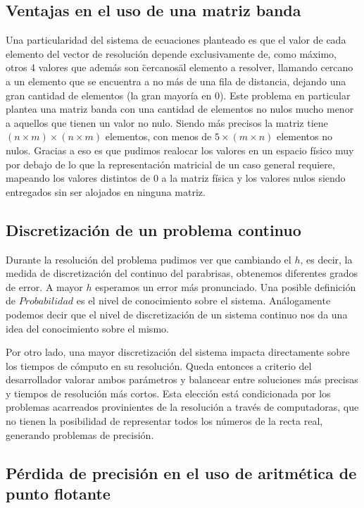 \subsection{Ventajas en el uso de una matriz banda}

Una particularidad del sistema de ecuaciones planteado es que el valor de cada elemento del vector de resoluci\'on depende exclusivamente de, como m\'aximo, otros 4 valores que adem\'as son \"cercanos\" al elemento a resolver, llamando cercano a un elemento que se encuentra a no m\'as de una fila de distancia, dejando una gran cantidad de elementos (la gran mayor\'ia en 0). Este problema en particular plantea una matriz banda con una cantidad de elementos no nulos mucho menor a aquellos que tienen un valor no nulo. Siendo m\'as precisos la matriz tiene $(n \times m) \times (n \times m)$ elementos, con menos de $5 \times (m \times n)$ elementos no nulos. Gracias a eso es que pudimos realocar los valores en un espacio f\'isico muy por debajo de lo que la representaci\'on matricial de un caso general requiere, mapeando los valores distintos de 0 a la matriz f\'isica y los valores nulos siendo entregados sin ser alojados en ninguna matriz.

\subsection{Discretizaci\'on de un problema continuo}

Durante la resoluci\'on del problema pudimos ver que cambiando el $h$, es decir, la medida de discretizaci\'on del continuo del parabrisas, obtenemos diferentes grados de error. A mayor $h$ esperamos un error m\'as pronunciado.
Una posible definici\'on de $Probabilidad$ es el nivel de conocimiento sobre el sistema. An\'alogamente podemos decir que el nivel de discretizaci\'on de un sistema continuo nos da una idea del conocimiento sobre el mismo.

Por otro lado, una mayor discretizaci\'on del sistema impacta directamente sobre los tiempos de c\'omputo en su resoluci\'on. Queda entonces a criterio del desarrollador valorar ambos par\'ametros y balancear entre soluciones m\'as precisas y tiempos de resoluci\'on m\'as cortos. Esta elecci\'on est\'a condicionada por los problemas acarreados provinientes de la resoluci\'on a trav\'es de computadoras, que no tienen la posibilidad de representar todos los n\'umeros de la recta real, generando problemas de precisi\'on.

\subsection{P\'erdida de precisi\'on en el uso de aritm\'etica de punto flotante}

